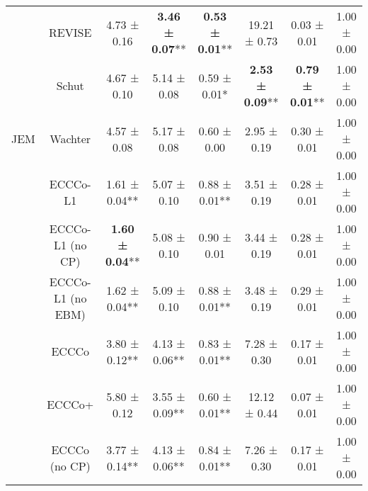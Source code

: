 \begin{table}
{\begin{tabular}[t]{cccccccc}
 & REVISE & 4.73 ± 0.16\hphantom{*}\hphantom{*} & \textbf{3.46 ± 0.07}** & \textbf{0.53 ± 0.01}** & 19.21 ± 0.73\hphantom{*}\hphantom{*} & 0.03 ± 0.01\hphantom{*}\hphantom{*} & 1.00 ± 0.00\hphantom{*}\hphantom{*}\\

 & Schut & 4.67 ± 0.10\hphantom{*}\hphantom{*} & 5.14 ± 0.08\hphantom{*}\hphantom{*} & 0.59 ± 0.01*\hphantom{*} & \textbf{2.53 ± 0.09}** & \textbf{0.79 ± 0.01}** & 1.00 ± 0.00\hphantom{*}\hphantom{*}\\

\multirow[t]{-10}{*}{\centering\arraybackslash JEM} & Wachter & 4.57 ± 0.08\hphantom{*}\hphantom{*} & 5.17 ± 0.08\hphantom{*}\hphantom{*} & 0.60 ± 0.00\hphantom{*}\hphantom{*} & 2.95 ± 0.19\hphantom{*}\hphantom{*} & 0.30 ± 0.01\hphantom{*}\hphantom{*} & 1.00 ± 0.00\hphantom{*}\hphantom{*}\\
\cmidrule{1-8}
 & ECCCo-L1 & 1.61 ± 0.04** & 5.07 ± 0.10\hphantom{*}\hphantom{*} & 0.88 ± 0.01** & 3.51 ± 0.19\hphantom{*}\hphantom{*} & 0.28 ± 0.01\hphantom{*}\hphantom{*} & 1.00 ± 0.00\hphantom{*}\hphantom{*}\\

 & ECCCo-L1 (no CP) & \textbf{1.60 ± 0.04}** & 5.08 ± 0.10\hphantom{*}\hphantom{*} & 0.90 ± 0.01\hphantom{*}\hphantom{*} & 3.44 ± 0.19\hphantom{*}\hphantom{*} & 0.28 ± 0.01\hphantom{*}\hphantom{*} & 1.00 ± 0.00\hphantom{*}\hphantom{*}\\

 & ECCCo-L1 (no EBM) & 1.62 ± 0.04** & 5.09 ± 0.10\hphantom{*}\hphantom{*} & 0.88 ± 0.01** & 3.48 ± 0.19\hphantom{*}\hphantom{*} & 0.29 ± 0.01\hphantom{*}\hphantom{*} & 1.00 ± 0.00\hphantom{*}\hphantom{*}\\

 & ECCCo & 3.80 ± 0.12** & 4.13 ± 0.06** & 0.83 ± 0.01** & 7.28 ± 0.30\hphantom{*}\hphantom{*} & 0.17 ± 0.01\hphantom{*}\hphantom{*} & 1.00 ± 0.00\hphantom{*}\hphantom{*}\\

 & ECCCo+ & 5.80 ± 0.12\hphantom{*}\hphantom{*} & 3.55 ± 0.09** & 0.60 ± 0.01** & 12.12 ± 0.44\hphantom{*}\hphantom{*} & 0.07 ± 0.01\hphantom{*}\hphantom{*} & 1.00 ± 0.00\hphantom{*}\hphantom{*}\\

 & ECCCo (no CP) & 3.77 ± 0.14** & 4.13 ± 0.06** & 0.84 ± 0.01** & 7.26 ± 0.30\hphantom{*}\hphantom{*} & 0.17 ± 0.01\hphantom{*}\hphantom{*} & 1.00 ± 0.00\hphantom{*}\hphantom{*}\\


\end{tabular}}
\end{table}
